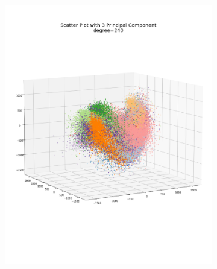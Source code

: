\documentclass[12pt, a4paper]{article}
\begin{document}
\begin{figure}[h]
\begin{subfigure}{0.3\linewidth}
        \includegraphics[width=\linewidth]{images/q4/a/projection_to_3d_with_angle240.png}
    \end{subfigure}
    \hfill
    \begin{subfigure}{0.3\linewidth}
        \centering

\end{subfigure}
\end{figure}
\end{document}
